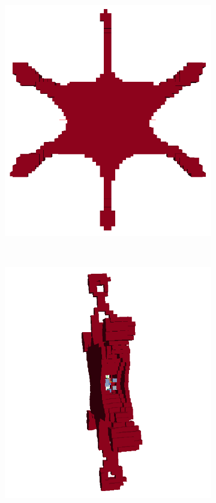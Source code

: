 \begin{figure}
\begin{subfigure}[c]{.2\linewidth}
\end{subfigure}
~
\begin{subfigure}[c]{.2\linewidth}
\centering
  \includegraphics[width=.9\linewidth]{Pictures/TopOp/Star_Optimized4_Trans.png}
\end{subfigure}
~
\begin{subfigure}[c]{.2\linewidth}
\centering
  \includegraphics[width=.9\linewidth]{Pictures/TopOp/Star_Optimized5_Trans.png}

\end{subfigure}
\end{figure}
